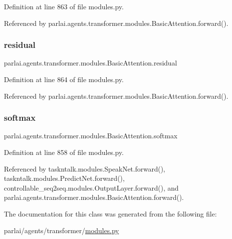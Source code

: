 Definition at line 863 of file modules.\+py.



Referenced by parlai.\+agents.\+transformer.\+modules.\+Basic\+Attention.\+forward().

\mbox{\label{classparlai_1_1agents_1_1transformer_1_1modules_1_1BasicAttention_a98c0f263db25cf305c333e04f8a0843d}} 
\subsubsection{\texorpdfstring{residual}{residual}}
{\footnotesize\ttfamily parlai.\+agents.\+transformer.\+modules.\+Basic\+Attention.\+residual}



Definition at line 864 of file modules.\+py.



Referenced by parlai.\+agents.\+transformer.\+modules.\+Basic\+Attention.\+forward().

\mbox{\label{classparlai_1_1agents_1_1transformer_1_1modules_1_1BasicAttention_a669fa3f4cd988703371fc127a4943f07}} 
\subsubsection{\texorpdfstring{softmax}{softmax}}
{\footnotesize\ttfamily parlai.\+agents.\+transformer.\+modules.\+Basic\+Attention.\+softmax}



Definition at line 858 of file modules.\+py.



Referenced by taskntalk.\+modules.\+Speak\+Net.\+forward(), taskntalk.\+modules.\+Predict\+Net.\+forward(), controllable\+\_\+seq2seq.\+modules.\+Output\+Layer.\+forward(), and parlai.\+agents.\+transformer.\+modules.\+Basic\+Attention.\+forward().



The documentation for this class was generated from the following file\+:\begin{DoxyCompactItemize}
\item 
parlai/agents/transformer/\hyperlink{parlai_2agents_2transformer_2modules_8py}{modules.\+py}\end{DoxyCompactItemize}
